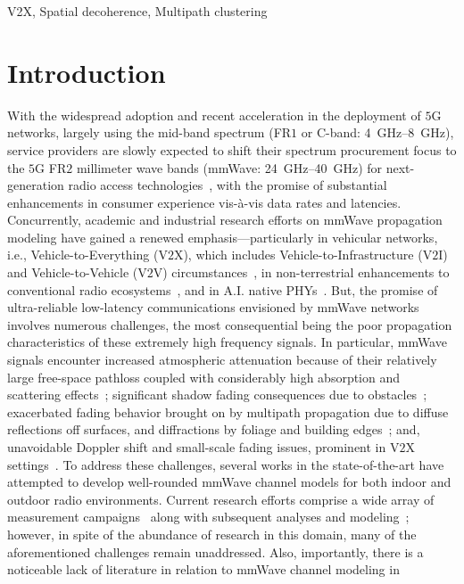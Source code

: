 \documentclass[10pt, twocolumn]{IEEEtran}
\begin{document}
\begin{IEEEkeywords}
    V2X, Spatial decoherence, Multipath clustering
\end{IEEEkeywords}
\vspace{-8mm}

\section{Introduction}\label{S1}
With the widespread adoption and recent acceleration in the deployment of $5$G networks, largely using the mid-band spectrum (FR$1$ or C-band: \SIrange{4}{8}{\giga\hertz}), service providers are slowly expected to shift their spectrum procurement focus to the $5$G FR$2$ millimeter wave bands (mmWave: \SIrange{24}{40}{\giga\hertz}) for next-generation radio access technologies~\cite{Ericsson_Press_Release, SkyQuest, mmWaveSurvey, Commercial, 5GBSurvey, 6GSurvey}, with the promise of substantial enhancements in consumer experience vis-\`{a}-vis data rates and latencies. Concurrently, academic and industrial research efforts on mmWave propagation modeling have gained a renewed emphasis---particularly in vehicular networks, i.e., Vehicle-to-Everything (V$2$X), which includes Vehicle-to-Infrastructure (V$2$I) and Vehicle-to-Vehicle (V$2$V) circumstances~\cite{VehicularBeamSelection, CVBeamAlignmentV2X}, in non-terrestrial enhancements to conventional radio ecosystems~\cite{mmWaveRuralNTNOpportunities, DJL_Recommendation, UAVBeamTracking}, and in A.I. native PHYs~\cite{6GAINative, OTAGANs}. But, the promise of ultra-reliable low-latency communications envisioned by mmWave networks involves numerous challenges, the most consequential being the poor propagation characteristics of these extremely high frequency signals. In particular, mmWave signals encounter increased atmospheric attenuation because of their relatively large free-space pathloss coupled with considerably high absorption and scattering effects~\cite{Rappaport}; significant shadow fading consequences due to obstacles~\cite{SuburbanGeometryJournal}; exacerbated fading behavior brought on by multipath propagation due to diffuse reflections off surfaces, and diffractions by foliage and building edges~\cite{Outdoor28G}; and, unavoidable Doppler shift and small-scale fading issues, prominent in V$2$X settings~\cite{V2XBlockages}. To address these challenges, several works in the state-of-the-art have attempted to develop well-rounded mmWave channel models for both indoor and outdoor radio environments. Current research efforts comprise a wide array of measurement campaigns~\cite{Purdue, Foliage, AgileLink, Harvard, Outdoor28G, Indoor60G, PDAPs, MolischSpatialIndoorOutdoor, DopplerHST} along with subsequent analyses and modeling~\cite{SuburbanGeometryJournal, FoliageSimulations, Indoor60G, Qualcomm3GPP, MacCartneyModelsOverview, SpatialConsistencyOriginal, MacCartneyRural, MolischEstimate, NISTModeling, QDC_NIST, D2DHumanBlockage}; however, in spite of the abundance of research in this domain, many of the aforementioned challenges remain unaddressed. Also, importantly, there is a noticeable lack of literature in relation to mmWave channel modeling in 
\end{document}
